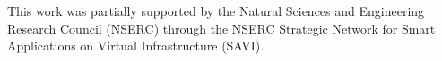 %
%


This work was partially supported by the Natural Sciences and Engineering Research Council (NSERC) through the NSERC Strategic Network for Smart Applications on Virtual Infrastructure (SAVI).